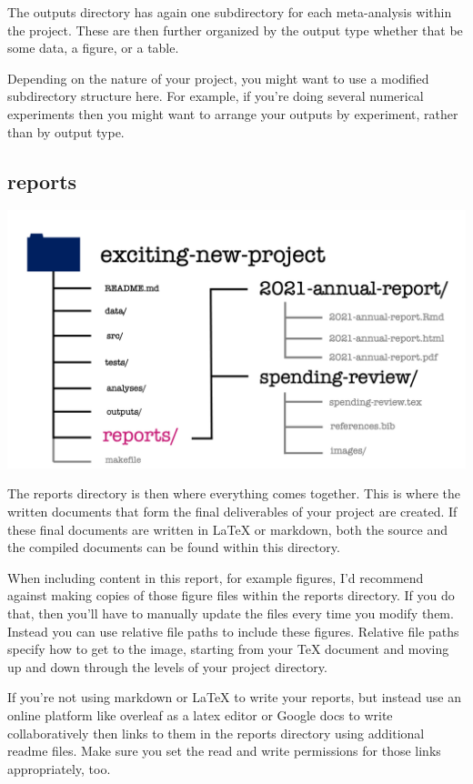 \documentclass[
  12pt,
]{book}
\begin{document}
The outputs directory has again one subdirectory for each meta-analysis within the project. These are then further organized by the output type whether that be some data, a figure, or a table.

Depending on the nature of your project, you might want to use a modified subdirectory structure here. For example, if you're doing several numerical experiments then you might want to arrange your outputs by experiment, rather than by output type.

\hypertarget{reports}{%
\subsection{reports}\label{reports}}

\includegraphics[width=0.8\linewidth]{images/101-workflows-organising-your-work/directory-structure-drawings/directory-structure-drawing-29}

The reports directory is then where everything comes together. This is where the written documents that form the final deliverables of your project are created. If these final documents are written in LaTeX or markdown, both the source and
the compiled documents can be found within this directory.

When including content in this report, for example figures, I'd recommend against
making copies of those figure files within the reports directory. If you do that, then you'll have to manually update the files every time you modify them. Instead you can use relative file paths to include these figures. Relative file paths specify how to get to the image, starting from your TeX document and moving up and down through the levels of your project directory.

If you're not using markdown or LaTeX to write your reports, but instead use an online platform like overleaf as a latex editor or Google docs to write collaboratively then links to them in the reports directory using additional readme files. Make sure you set the read and write permissions for those links appropriately, too.
\end{document}
